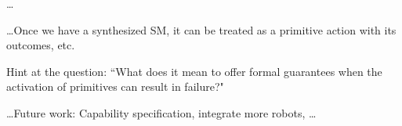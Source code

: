 
\ldots

\ldots Once we have a synthesized SM, it can be treated as a primitive action with its outcomes, etc.

Hint at the question: ``What does it mean to offer formal guarantees when the activation of primitives can result in failure?"

\ldots Future work: Capability specification, integrate more robots, \ldots